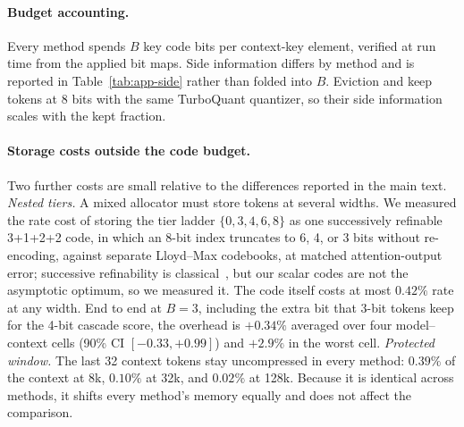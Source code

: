 \paragraph{Budget accounting.}
Every method spends $B$ key code bits per context-key element, verified at run
time from the applied bit maps.  Side information differs by method and is
reported in Table~\ref{tab:app-side} rather than folded into $B$.  Eviction and
\sieve{} keep tokens at 8 bits with the same TurboQuant quantizer, so their
side information scales with the kept fraction.

\paragraph{Storage costs outside the code budget.}
Two further costs are small relative to the differences reported in the main
text.  \emph{Nested tiers.}  A mixed allocator must store tokens at several
widths.  We measured the rate cost of storing the tier ladder
$\{0,3,4,6,8\}$ as one successively refinable 3+1+2+2 code, in which an 8-bit
index truncates to 6, 4, or 3 bits without re-encoding, against separate
Lloyd--Max codebooks, at matched attention-output error; successive refinability is classical~\citep{equitz1991successive}, but our scalar codes are not the asymptotic optimum, so we measured it.  The code itself costs
at most $0.42\%$ rate at any width.  End to end at $B=3$, including the extra
bit that 3-bit tokens keep for the 4-bit cascade score, the overhead is
$+0.34\%$ averaged over four model--context cells (90\% CI $[-0.33,+0.99]$) and
$+2.9\%$ in the worst cell.  \emph{Protected window.}  The last 32 context
tokens stay uncompressed in every method: $0.39\%$ of the context at 8k,
$0.10\%$ at 32k, and $0.02\%$ at 128k.  Because it is identical across methods,
it shifts every method's memory equally and does not affect the comparison.

